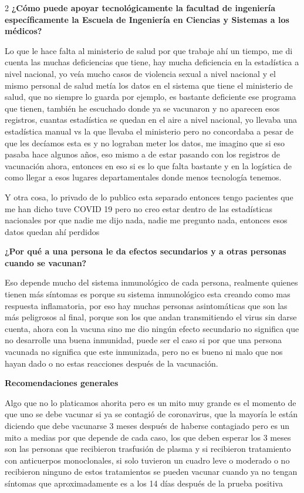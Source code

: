 \documentclass[12pt,spanish,Letterpaper,openany]{book}
\begin{document}
\begin {multicols}{2}
\textbf{¿Cómo puede apoyar tecnológicamente la facultad de ingeniería específicamente la Escuela de Ingeniería en Ciencias y Sistemas a los médicos?}

Lo que le hace falta al ministerio de salud por que trabaje ahí un tiempo, me di cuenta las
muchas deficiencias que tiene, hay mucha deficiencia en la estadística a nivel nacional, yo
veía mucho casos de violencia sexual a nivel nacional y el mismo personal de salud metía
los datos en el sistema que tiene el ministerio de salud, que no siempre lo guarda por ejemplo,
es bastante deficiente ese programa que tienen, también he escuchado donde ya se vacunaron
y no aparecen esos registros, cuantas estadística se quedan en el aire a nivel nacional, yo
llevaba una estadística manual vs la que llevaba el ministerio pero no concordaba a pesar de
que les decíamos esta es y no lograban meter los datos, me imagino que si eso pasaba hace
algunos años, eso mismo a de estar pasando con los registros de vacunación ahora, entonces
en eso si es lo que falta bastante y en la logística de como llegar a esos lugares
departamentales donde menos tecnología tenemos.

Y otra cosa, lo privado de lo publico esta separado entonces tengo pacientes que me han
dicho tuve COVID 19 pero no creo estar dentro de las estadísticas nacionales por que nadie
me dijo nada, nadie me pregunto nada, entonces esos datos quedan ahí perdidos

\textbf{¿Por qué a una persona le da efectos secundarios y a otras personas cuando se vacunan?}

Eso depende mucho del sistema inmunológico de cada persona, realmente quienes tienen
más síntomas es porque su sistema inmunológico esta creando como mas respuesta
inflamatoria, por eso hay muchas personas asintomáticas que son las más peligrosos al final,
porque son los que andan transmitiendo el virus sin darse cuenta, ahora con la vacuna sino
me dio ningún efecto secundario no significa que no desarrolle una buena inmunidad, puede
ser el caso si por que una persona vacunada no significa que este inmunizada, pero no es
bueno ni malo que nos hayan dado o no estas reacciones después de la vacunación.

\textbf{Recomendaciones generales}

Algo que no lo platicamos ahorita pero es un mito muy grande es el momento de que uno se
debe vacunar si ya se contagió de coronavirus, que la mayoría le están diciendo que debe
vacunarse 3 meses después de haberse contagiado pero es un mito a medias por que depende
de cada caso, los que deben esperar los 3 meses son las personas que recibieron trasfusión de
plasma y si recibieron tratamiento con anticuerpos monoclonales, si solo tuvieron un cuadro
leve o moderado o no recibieron ninguno de estos tratamientos se pueden vacunar cuando ya
no tengan síntomas que aproximadamente es a los 14 días después de la prueba positiva

\end {multicols}
\end{document}
